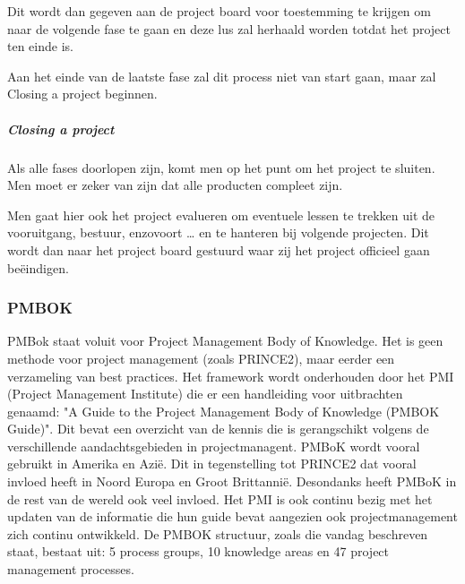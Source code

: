 \documentclass[]{article}
\begin{document}
Dit wordt dan gegeven aan de project board voor toestemming te krijgen om naar de volgende fase te gaan en deze lus zal herhaald worden totdat het project ten einde is. 

Aan het einde van de laatste fase zal dit process niet van start gaan, maar zal Closing a project beginnen.
\subparagraph{Closing a project}
Als alle fases doorlopen zijn, komt men op het punt om het project te sluiten. Men moet er zeker van zijn dat alle producten compleet zijn. 

Men gaat hier ook het project evalueren om eventuele lessen te trekken uit de vooruitgang, bestuur, enzovoort … en te hanteren bij volgende projecten. Dit wordt dan naar het project board gestuurd waar zij het project officieel gaan beëindigen.

\subsubsection{PMBOK}
PMBok staat voluit voor Project Management Body of Knowledge. Het is geen methode voor project management (zoals PRINCE2), maar eerder een verzameling van best practices. Het framework wordt onderhouden door het PMI (Project Management Institute) die er een handleiding voor uitbrachten genaamd: "A Guide to the Project Management Body of Knowledge (PMBOK\textsuperscript{\textregistered} Guide)". Dit bevat een overzicht van de kennis die is gerangschikt volgens de verschillende aandachtsgebieden in projectmanagent. PMBoK wordt vooral gebruikt in Amerika en Azië. Dit in tegenstelling tot PRINCE2 dat vooral invloed heeft in Noord Europa en Groot Brittannië. Desondanks heeft PMBoK in de rest van de wereld ook veel invloed. Het PMI is ook continu bezig met het updaten van de informatie die hun guide bevat aangezien ook projectmanagement zich continu ontwikkeld. De PMBOK\textsuperscript{\textregistered} structuur, zoals die vandag beschreven staat, bestaat uit: 5 process groups, 10 knowledge areas en 47 project management processes.	
\end{document}
